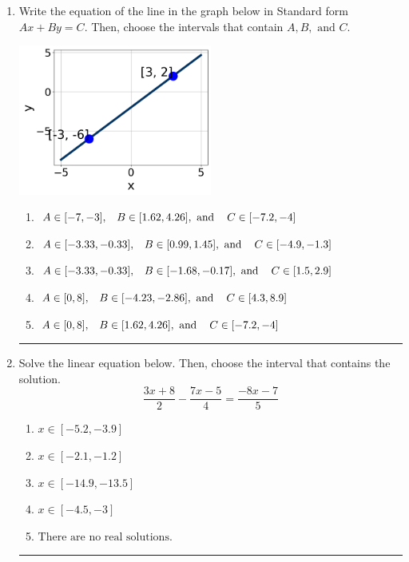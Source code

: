 \documentclass[14pt]{extbook}
\newcommand{\litem}[1]{\item#1\hspace*{-1cm}\rule{\textwidth}{0.4pt}}
\begin{document}
\begin{enumerate}
{\begin{enumerate}[label=\Alph*.]
\end{enumerate} }
\litem{
Write the equation of the line in the graph below in Standard form $Ax+By=C$. Then, choose the intervals that contain $A, B, \text{ and } C$.
\begin{center}
    \includegraphics[width=0.5\textwidth]{../Figures/linearGraphToStandardCopyC.png}
\end{center}
\begin{enumerate}[label=\Alph*.]
\item \( A \in [-7, -3], \hspace{3mm} B \in [1.62, 4.26], \text{ and } \hspace{3mm} C \in [-7.2, -4] \)
\item \( A \in [-3.33, -0.33], \hspace{3mm} B \in [0.99, 1.45], \text{ and } \hspace{3mm} C \in [-4.9, -1.3] \)
\item \( A \in [-3.33, -0.33], \hspace{3mm} B \in [-1.68, -0.17], \text{ and } \hspace{3mm} C \in [1.5, 2.9] \)
\item \( A \in [0, 8], \hspace{3mm} B \in [-4.23, -2.86], \text{ and } \hspace{3mm} C \in [4.3, 8.9] \)
\item \( A \in [0, 8], \hspace{3mm} B \in [1.62, 4.26], \text{ and } \hspace{3mm} C \in [-7.2, -4] \)

\end{enumerate} }
\litem{
Solve the linear equation below. Then, choose the interval that contains the solution.\[ \frac{3x + 8}{2} - \frac{7x -5}{4} = \frac{-8x -7}{5} \]\begin{enumerate}[label=\Alph*.]
\item \( x \in [-5.2, -3.9] \)
\item \( x \in [-2.1, -1.2] \)
\item \( x \in [-14.9, -13.5] \)
\item \( x \in [-4.5, -3] \)
\item \( \text{There are no real solutions.} \)


\end{enumerate}}
\end{enumerate}
\end{document}
